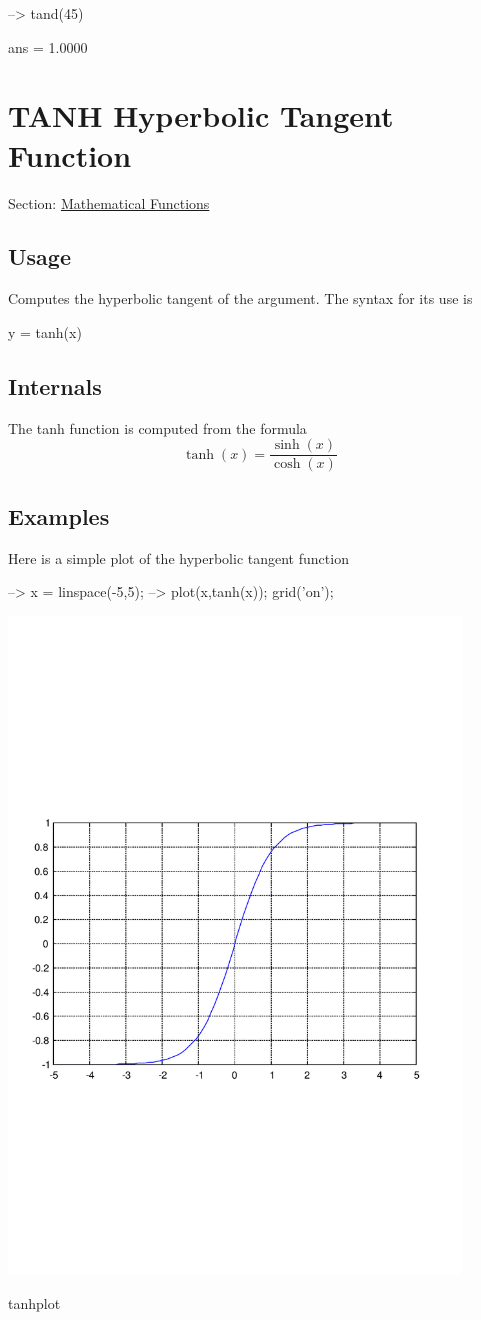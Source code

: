 \begin{DoxyVerbInclude}
--> tand(45)

ans = 
    1.0000 
\end{DoxyVerbInclude}
 \hypertarget{mathfunctions_tanh}{}\section{T\-A\-N\-H Hyperbolic Tangent Function}\label{mathfunctions_tanh}
Section\-: \hyperlink{sec_mathfunctions}{Mathematical Functions} \hypertarget{vtkwidgets_vtkxyplotwidget_Usage}{}\subsection{Usage}\label{vtkwidgets_vtkxyplotwidget_Usage}
Computes the hyperbolic tangent of the argument. The syntax for its use is \begin{DoxyVerb}   y = tanh(x)
\end{DoxyVerb}
 \hypertarget{transforms_svd_Function}{}\subsection{Internals}\label{transforms_svd_Function}
The {\ttfamily tanh} function is computed from the formula \[ \tanh(x) = \frac{\sinh(x)}{\cosh(x)} \] \hypertarget{variables_matrix_Examples}{}\subsection{Examples}\label{variables_matrix_Examples}
Here is a simple plot of the hyperbolic tangent function


\begin{DoxyVerbInclude}
--> x = linspace(-5,5);
--> plot(x,tanh(x)); grid('on');
\end{DoxyVerbInclude}


 
\begin{DoxyImage}
\includegraphics[width=12cm]{tanhplot}
\caption{tanhplot}
\end{DoxyImage}
 